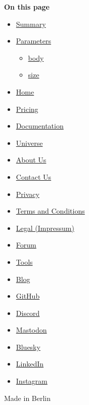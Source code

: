 \textbf{On this page}

\begin{itemize}
\tightlist
\item
  \hyperref[summary]{Summary}
\item
  \hyperref[parameters]{Parameters}

  \begin{itemize}
  \tightlist
  \item
    \hyperref[parameters-body]{body}
  \item
    \hyperref[parameters-size]{size}
  \end{itemize}
\end{itemize}

\begin{itemize}
\tightlist
\item
  \href{/}{Home}
\item
  \href{/pricing/}{Pricing}
\item
  \href{/docs/}{Documentation}
\item
  \href{/universe/}{Universe}
\item
  \href{/about/}{About Us}
\item
  \href{/contact/}{Contact Us}
\item
  \href{/privacy/}{Privacy}
\item
  \href{https://typst.app/terms}{Terms and Conditions}
\item
  \href{/legal/}{Legal (Impressum)}
\end{itemize}

\begin{itemize}
\tightlist
\item
  \href{https://forum.typst.app}{Forum}
\item
  \href{/tools/}{Tools}
\item
  \href{/blog/}{Blog}
\item
  \href{https://github.com/typst/}{GitHub}
\item
  \href{https://discord.gg/2uDybryKPe}{Discord}
\item
  \href{https://mastodon.social/@typst}{Mastodon}
\item
  \href{https://bsky.app/profile/typst.app}{Bluesky}
\item
  \href{https://www.linkedin.com/company/typst/}{LinkedIn}
\item
  \href{https://instagram.com/typstapp/}{Instagram}
\end{itemize}

Made in Berlin
